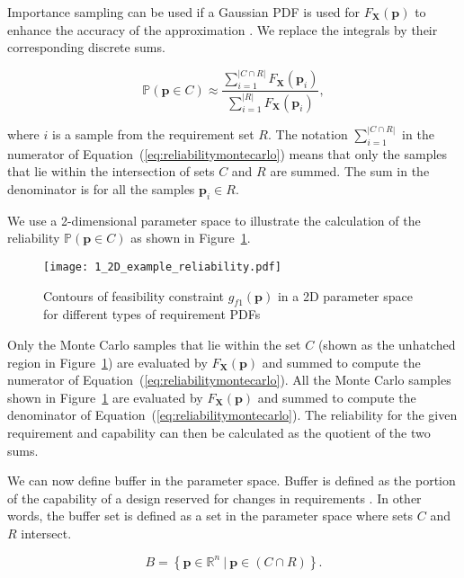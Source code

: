 Importance sampling can be used if a Gaussian \ac{PDF} is used for $F_\mathbf{X}(\mathbf{p})$ to enhance the accuracy of the approximation \cite{Frangopol2003a,ForouzandehShahraki2014,Kleiber2004}. We replace the integrals by their corresponding discrete sums.

\begin{equation} \label{eq:reliabilitymontecarlo}
	\mathbb{P}(\mathbf{p} \in C) \approx \dfrac{\sum\limits_{i=1}^{|{C\cap R}|} F_{\mathbf{X}}(\mathbf{p}_i)}{\sum\limits_{i=1}^{|R|} F_{\mathbf{X}}(\mathbf{p}_i)},
\end{equation}

where $i$ is a sample from the requirement set $R$. The notation $\sum_{i=1}^{|{C\cap R}|}$ in the numerator of Equation~(\ref{eq:reliabilitymontecarlo}) means that only the samples that lie within the intersection of sets $C$ and $R$ are summed. The sum in the denominator is for all the samples $\mathbf{p}_i \in R$.

We use a 2-dimensional parameter space to illustrate the calculation of the reliability $\mathbb{P}(\mathbf{p} \in C)$ as shown in Figure~\ref{fig:2Dexamplereliability}.

\begin{figure}[h!]
	\centering
	\texttt{[image: 1\_2D\_example\_reliability.pdf]}
	\caption{Contours of feasibility constraint $g_{f1}(\mathbf{p})$ in a 2D parameter space for different types of requirement \acp{PDF}}
	\label{fig:2Dexamplereliability}
\end{figure}

Only the Monte Carlo samples that lie within the set $C$ (shown as the unhatched region in Figure~\ref{fig:2Dexamplereliability}) are evaluated by $F_{\mathbf{X}}(\mathbf{p})$ and summed to compute the numerator of Equation~(\ref{eq:reliabilitymontecarlo}). All the Monte Carlo samples shown in Figure~\ref{fig:2Dexamplereliability} are evaluated by $F_{\mathbf{X}}(\mathbf{p})$ and summed to compute the denominator of Equation~(\ref{eq:reliabilitymontecarlo}). The reliability for the given requirement and capability can then be calculated as the quotient of the two sums.

We can now define buffer in the parameter space. Buffer is defined as the portion of the capability of a design reserved for changes in requirements \cite{Eckert2019}. In other words, the buffer set is defined as a set in the parameter space where sets $C$ and $R$ intersect.

\begin{equation} \label{eq:buffer}
	\textit{B} = \left\{\mathbf{p} \in \mathbb{R}^n~|~\mathbf{p} \in \left(C\cap R\right) \right\}.
\end{equation}

